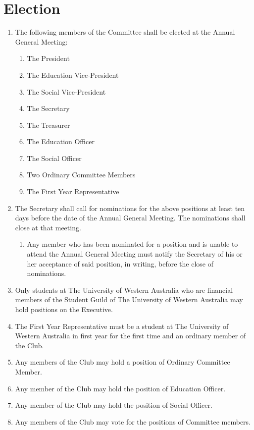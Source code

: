 \documentclass[11pt]{article} %
\begin{document}
\section{Election}
\begin{enumerate}
	\item The following members of the Committee shall be elected at the Annual General Meeting:
		\begin{enumerate}[1.]
			\item The President
			\item The Education Vice-President
			\item The Social Vice-President
			\item The Secretary
			\item The Treasurer
			\item The Education Officer
			\item The Social Officer
			\item Two Ordinary Committee Members
			\item The First Year Representative
		\end{enumerate}
	\item The Secretary shall call for nominations for the above positions at least ten days before the date of the Annual General Meeting. The nominations shall close at that meeting.
	\begin{enumerate}[1.]
			\item Any member who has been nominated for a position and is unable to attend the Annual General Meeting must notify the Secretary of his or her acceptance of said position, in writing, before the close of nominations.
		\end{enumerate}
	\item Only students at The University of Western Australia who are financial members of the Student Guild of The University of Western Australia may hold positions on the Executive.
	\item The First Year Representative must be a student at The University of Western Australia in first year for the first time and an ordinary member of the Club.
	\item Any members of the Club may hold a position of Ordinary Committee Member.
	\item Any member of the Club may hold the position of Education Officer.
	\item Any member of the Club may hold the position of Social Officer.
	\item Any members of the Club may vote for the positions of Committee members.
\end{enumerate}
\end{document}
